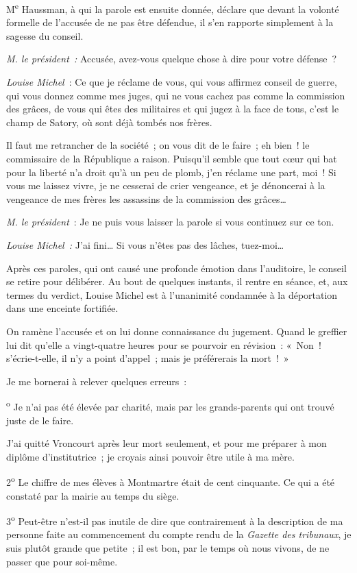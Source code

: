 \documentclass[french,twoside]{book} %
\def\mednobreak{\ifdim\lastskip<\medskipamount
  \removelastskip\nopagebreak\medskip\fi}
\newcommand{\labelblock}[1]{\medbreak{\noindent\color{rubric}\bfseries #1}\par\mednobreak}
\newcommand\chapterclose{} %
\begin{document}
M\textsuperscript{e} Haussman, à qui la parole est ensuite donnée, déclare que devant la volonté formelle de l’accusée de ne pas être défendue, il s’en rapporte simplement à la sagesse du conseil.\par
\bigbreak
\noindent \emph{M. le président :} Accusée, avez-vous quelque chose à dire pour votre défense ?\par
\emph{Louise Michel} : Ce que je réclame de vous, qui vous affirmez conseil de guerre, qui vous donnez comme mes juges, qui ne vous cachez pas comme la commission des grâces, de vous qui êtes des militaires et qui jugez à la face de tous, c’est le champ de Satory, où sont déjà tombés nos frères.\par
Il faut me retrancher de la société ; on vous dit de le faire ; eh bien ! le commissaire de la République a raison. Puisqu’il semble que tout cœur qui bat pour la liberté n’a droit qu’à un peu de plomb, j’en réclame une part, moi ! Si vous me laissez vivre, je ne cesserai de crier vengeance, et je dénoncerai à la vengeance de mes frères les assassins de la commission des grâces…\par
\emph{M. le président} : Je ne puis vous laisser la parole si vous continuez sur ce ton.\par
\emph{Louise Michel :} J’ai fini… Si vous n’êtes pas des lâches, tuez-moi…\par
\bigbreak
\noindent Après ces paroles, qui ont causé une profonde émotion dans l’auditoire, le conseil se retire pour délibérer. Au bout de  quelques instants, il rentre en séance, et, aux termes du verdict, Louise Michel est à l’unanimité condamnée à la déportation dans une enceinte fortifiée.\par
On ramène l’accusée et on lui donne connaissance du jugement. Quand le greffier lui dit qu’elle a vingt-quatre heures pour se pourvoir en révision : « Non ! s’écrie-t-elle, il n’y a point d’appel ; mais je préférerais la mort ! »\par

\labelblock{OBSERVATIONS}

\noindent Je me bornerai à relever quelques erreurs :\par
\bigbreak
{}\textsuperscript{o} Je n’ai pas été élevée par charité, mais par les grands-parents qui ont trouvé juste de le faire.\par
J’ai quitté Vroncourt après leur mort seulement, et pour me préparer à mon diplôme d’institutrice ; je croyais ainsi pouvoir être utile à ma mère.\par
2\textsuperscript{o} Le chiffre de mes élèves à Montmartre était de cent cinquante. Ce qui a été constaté par la mairie au temps du siège.\par
3\textsuperscript{o} Peut-être n’est-il pas inutile de dire que contrairement à la description de ma personne faite au commencement du compte rendu de la \emph{Gazette des tribunaux}, je suis plutôt grande que petite ; il est bon, par le temps où nous vivons, de ne passer que pour soi-même.
\chapterclose
\end{document}
